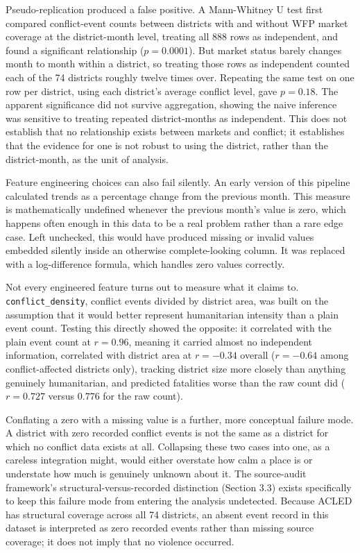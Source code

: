 \documentclass[12pt,a4paper]{article}
\begin{document}
Pseudo-replication produced a false positive. A Mann-Whitney U test first compared conflict-event counts between districts with and without WFP market coverage at the district-month level, treating all 888 rows as independent, and found a significant relationship ($p = 0.0001$). But market status barely changes month to month within a district, so treating those rows as independent counted each of the 74 districts roughly twelve times over. Repeating the same test on one row per district, using each district's average conflict level, gave $p = 0.18$. The apparent significance did not survive aggregation, showing the naive inference was sensitive to treating repeated district-months as independent. This does not establish that no relationship exists between markets and conflict; it establishes that the evidence for one is not robust to using the district, rather than the district-month, as the unit of analysis.

Feature engineering choices can also fail silently. An early version of this pipeline calculated trends as a percentage change from the previous month. This measure is mathematically undefined whenever the previous month's value is zero, which happens often enough in this data to be a real problem rather than a rare edge case. Left unchecked, this would have produced missing or invalid values embedded silently inside an otherwise complete-looking column. It was replaced with a log-difference formula, which handles zero values correctly.

Not every engineered feature turns out to measure what it claims to. \texttt{conflict\_density}, conflict events divided by district area, was built on the assumption that it would better represent humanitarian intensity than a plain event count. Testing this directly showed the opposite: it correlated with the plain event count at $r = 0.96$, meaning it carried almost no independent information, correlated with district area at $r = -0.34$ overall ($r = -0.64$ among conflict-affected districts only), tracking district size more closely than anything genuinely humanitarian, and predicted fatalities worse than the raw count did ($r = 0.727$ versus $0.776$ for the raw count).

Conflating a zero with a missing value is a further, more conceptual failure mode. A district with zero recorded conflict events is not the same as a district for which no conflict data exists at all. Collapsing these two cases into one, as a careless integration might, would either overstate how calm a place is or understate how much is genuinely unknown about it. The source-audit framework's structural-versus-recorded distinction (Section 3.3) exists specifically to keep this failure mode from entering the analysis undetected. Because ACLED has structural coverage across all 74 districts, an absent event record in this dataset is interpreted as zero recorded events rather than missing source coverage; it does not imply that no violence occurred.
\end{document}
